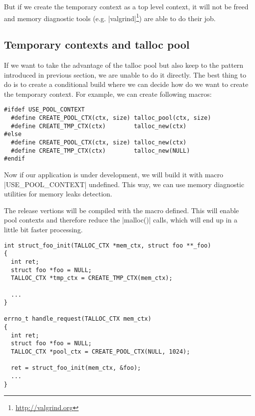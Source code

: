 But if we create the temporary context as a top level context, it will not be
freed and memory diagnostic tools
(e.g. |valgrind|\footnote{\url{http://valgrind.org}}) are able to do their job.

\subsection{Temporary contexts and talloc pool}
\label{talloc:subsec:tmp-ctx-and-pool}

If we want to take the advantage of the talloc pool but also keep to the
pattern introduced in previous section, we are unable to do it directly. The
best thing to do is to create a conditional build where we can decide how do we
want to create the temporary context. For example, we can create following
macros:

\begin{lstlisting}[caption={Conditional temporary context
macros},label=lst:tmp-ctx-4]
#ifdef USE_POOL_CONTEXT
  #define CREATE_POOL_CTX(ctx, size) talloc_pool(ctx, size)
  #define CREATE_TMP_CTX(ctx)        talloc_new(ctx)
#else
  #define CREATE_POOL_CTX(ctx, size) talloc_new(ctx)
  #define CREATE_TMP_CTX(ctx)        talloc_new(NULL)
#endif
\end{lstlisting}

Now if our application is under development, we will build it with macro
|USE_POOL_CONTEXT| undefined. This way, we  can use memory diagnostic
utilities for memory leaks detection.

The release vertions will be compiled with the macro defined. This will  enable
pool contexts and therefore reduce the |malloc()| calls, which will end up in a
little bit faster processing.

\begin{lstlisting}[caption={Conditional temporary context},label=lst:tmp-ctx-5]
int struct_foo_init(TALLOC_CTX *mem_ctx, struct foo **_foo)
{
  int ret;
  struct foo *foo = NULL;
  TALLOC_CTX *tmp_ctx = CREATE_TMP_CTX(mem_ctx);

  ...
}

errno_t handle_request(TALLOC_CTX mem_ctx)
{
  int ret;
  struct foo *foo = NULL;
  TALLOC_CTX *pool_ctx = CREATE_POOL_CTX(NULL, 1024);
  
  ret = struct_foo_init(mem_ctx, &foo);
  ...
}
\end{lstlisting}